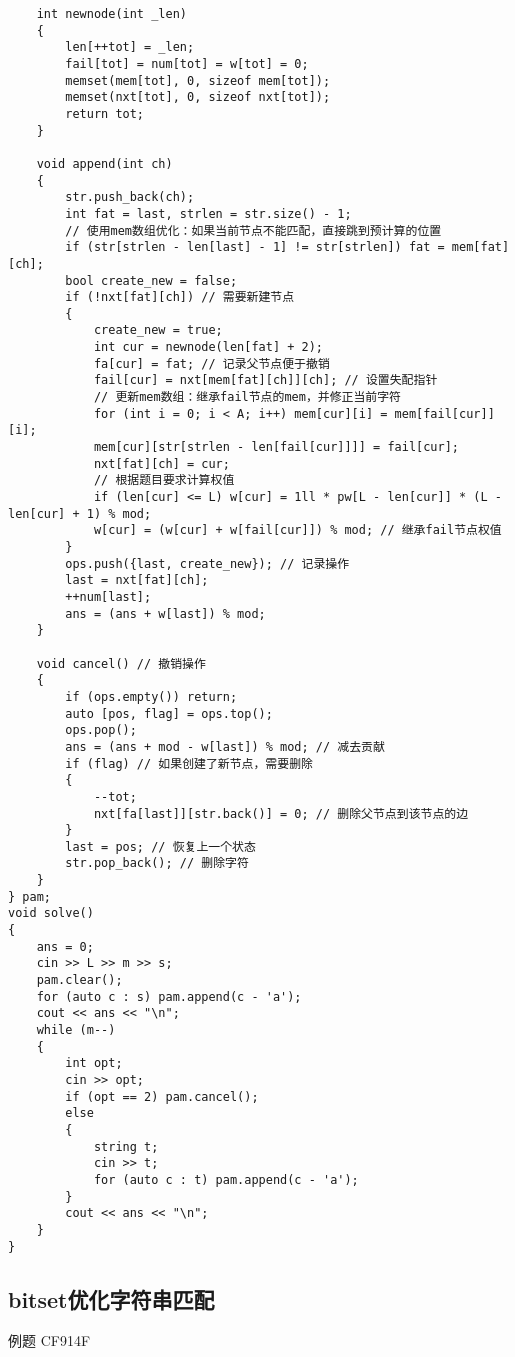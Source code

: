 \documentclass[a4paper, fontset=none]{ctexart}
\begin{document}
\begin{verbatim}
    int newnode(int _len)
    {
        len[++tot] = _len;
        fail[tot] = num[tot] = w[tot] = 0;
        memset(mem[tot], 0, sizeof mem[tot]);
        memset(nxt[tot], 0, sizeof nxt[tot]);
        return tot;
    }

    void append(int ch)
    {
        str.push_back(ch);
        int fat = last, strlen = str.size() - 1;
        // 使用mem数组优化：如果当前节点不能匹配，直接跳到预计算的位置
        if (str[strlen - len[last] - 1] != str[strlen]) fat = mem[fat][ch];
        bool create_new = false;
        if (!nxt[fat][ch]) // 需要新建节点
        {
            create_new = true;
            int cur = newnode(len[fat] + 2);
            fa[cur] = fat; // 记录父节点便于撤销
            fail[cur] = nxt[mem[fat][ch]][ch]; // 设置失配指针
            // 更新mem数组：继承fail节点的mem，并修正当前字符
            for (int i = 0; i < A; i++) mem[cur][i] = mem[fail[cur]][i];
            mem[cur][str[strlen - len[fail[cur]]]] = fail[cur];
            nxt[fat][ch] = cur;
            // 根据题目要求计算权值
            if (len[cur] <= L) w[cur] = 1ll * pw[L - len[cur]] * (L - len[cur] + 1) % mod;
            w[cur] = (w[cur] + w[fail[cur]]) % mod; // 继承fail节点权值
        }
        ops.push({last, create_new}); // 记录操作
        last = nxt[fat][ch];
        ++num[last];
        ans = (ans + w[last]) % mod;
    }

    void cancel() // 撤销操作
    {
        if (ops.empty()) return;
        auto [pos, flag] = ops.top();
        ops.pop();
        ans = (ans + mod - w[last]) % mod; // 减去贡献
        if (flag) // 如果创建了新节点，需要删除
        {
            --tot;
            nxt[fa[last]][str.back()] = 0; // 删除父节点到该节点的边
        }
        last = pos; // 恢复上一个状态
        str.pop_back(); // 删除字符
    }
} pam;
void solve()
{
    ans = 0;
    cin >> L >> m >> s;
    pam.clear();
    for (auto c : s) pam.append(c - 'a');
    cout << ans << "\n";
    while (m--)
    {
        int opt;
        cin >> opt;
        if (opt == 2) pam.cancel();
        else
        {
            string t;
            cin >> t;
            for (auto c : t) pam.append(c - 'a');
        }
        cout << ans << "\n";
    }
}
\end{verbatim}

\subsection{bitset优化字符串匹配}

例题 CF914F
\end{document}
